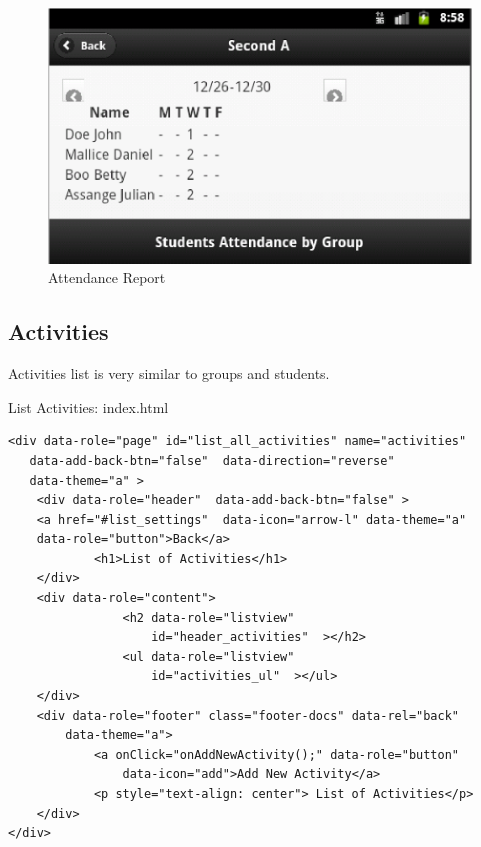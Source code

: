 \begin{figure}
    \begin{center}
        \includegraphics{eduxes_reports_attendance1.eps}
        \caption{Attendance Report}
        \label{fig:EduXesAttendanceReports}
    \end{center}
\end{figure}

\newpage
\subsection{Activities}   

Activities list is very similar to groups and students.
\begin{bclogo}[couleur=blue!30,arrondi=0.1,ombre=true ] 
{List Activities: index.html \label{activities_list}}
\begin{verbatim}
<div data-role="page" id="list_all_activities" name="activities"
   data-add-back-btn="false"  data-direction="reverse"  
   data-theme="a" >
    <div data-role="header"  data-add-back-btn="false" >
    <a href="#list_settings"  data-icon="arrow-l" data-theme="a" 
    data-role="button">Back</a>
            <h1>List of Activities</h1>
    </div>
    <div data-role="content">
                <h2 data-role="listview" 
                    id="header_activities"  ></h2>
                <ul data-role="listview" 
                    id="activities_ul"  ></ul>
    </div>
    <div data-role="footer" class="footer-docs" data-rel="back" 
        data-theme="a">
            <a onClick="onAddNewActivity();" data-role="button" 
                data-icon="add">Add New Activity</a>
            <p style="text-align: center"> List of Activities</p>
    </div>
</div>
\end{verbatim}
\end{bclogo}
\newpage

